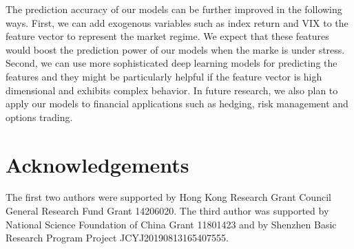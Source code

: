 \documentclass[11pt,a4paper]{article}
\theoremstyle{remark}
\begin{document}
The prediction accuracy of our models can be further improved in the following ways. First, we can add exogenous variables such as index return and VIX to the feature vector to represent the market regime. We expect that these features would boost the prediction power of our models when the marke is under stress. Second, we can use more sophisticated deep learning models for predicting the features and they might be particularly helpful if the feature vector is high dimensional and exhibits complex behavior. In future research, we also plan to apply our models to financial applications such as hedging, risk management and options trading.

\section*{Acknowledgements}
The first two authors were supported by Hong Kong Research Grant Council General Research Fund Grant 14206020. The third author was supported by National Science Foundation of China Grant 11801423 and by Shenzhen Basic Research Program Project JCYJ20190813165407555.



\end{document}

